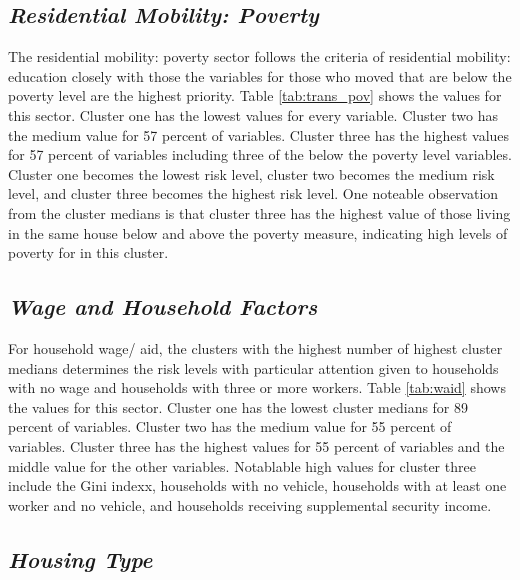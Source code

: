 

\pagebreak

\subsection{\textit{Residential Mobility: Poverty}}

The residential mobility: poverty sector follows the criteria of residential mobility: education closely with those the variables for those who moved that are below the poverty level are the highest priority. Table \ref{tab:trans_pov} shows the values for this sector. Cluster one has the lowest values for every variable. Cluster two has the medium value for 57 percent of variables. Cluster three has the highest values for 57 percent of variables including three of the below the poverty level variables. Cluster one becomes the lowest risk level, cluster two becomes the medium risk level, and cluster three becomes the highest risk level. One noteable observation from the cluster medians is that cluster three has the highest value of those living in the same house below and above the poverty measure, indicating high levels of poverty for \cts in this cluster.



\subsection{\textit{Wage and Household Factors}}

For household wage/ aid, the clusters with the highest number of highest cluster medians determines the risk levels with particular attention given to households with no wage and households with three or more workers. Table \ref{tab:waid} shows the values for this sector. Cluster one has the lowest cluster medians for 89 percent of variables. Cluster two has the medium value for 55 percent of variables. Cluster three has the highest values for 55 percent of variables and the middle value for the other variables. Notablable high values for cluster three include the Gini indexx, households with no vehicle, households with at least one worker and no vehicle, and households receiving supplemental security income.  



\subsection{\textit{Housing Type}}

